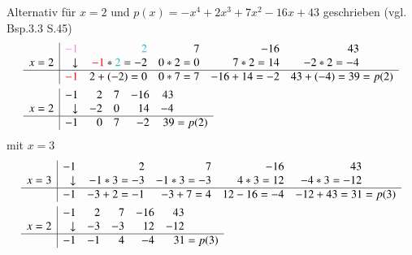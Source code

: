 \documentclass[10pt,a4paper]{article}
\begin{document}
Alternativ für $x=2$ und $p(x) = -x^4 + 2x^3 + 7x^2 - 16x + 43$ geschrieben (vgl. Bsp.3.3 S.45)
\begin{align*}
&\begin{array}[htbp]{c|rrrrr}
	      & {\color{Lavender}-1} & {\color{Turquoise}2}                    & 7      & -16         & 43 \qquad \quad \\
	x = 2 & \downarrow           & {\color{red}-1}*{\color{Turquoise}2}=-2 & 0*2= 0 & 7*2 = 14    & -2*2 = -4 \qquad \quad \\ \hline
	      & {\color{red}-1}      & 2+(-2)=0                                & 0*7=7  & -16+14 = -2 & 43+(-4) = 39 = p(2)
\end{array} \\
&\begin{array}[htbp]{c|rrrrr}
	      & -1         & 2  & 7 & -16 & 43  \qquad \quad      \\
	x = 2 & \downarrow & -2 & 0 & 14  & -4 \qquad \quad      \\ \hline
	      & -1         & 0  & 7 & -2  & 39 = p(2)
\end{array}
\end{align*}
mit $x=3$
\begin{align*}
&\begin{array}[htbp]{c|rrrrr}
	      & -1         & 2       & 7       & -16        & 43         \qquad \quad \\
	x = 3 & \downarrow & -1*3=-3 & -1*3=-3 & 4*3 = 12   & -4*3 = -12 \qquad \quad \\ \hline
	      & -1         & -3+2=-1 & -3+7=4  & 12-16 = -4 & -12+43 = 31 = p(3)
\end{array} \\
&\begin{array}[htbp]{c|rrrrr}
	      & -1         & 2  & 7  & -16 & 43   \qquad \quad \\
	x = 2 & \downarrow & -3 & -3 & 12  & -12  \qquad \quad \\ \hline
	      & -1         & -1 & 4  & -4  & 31 = p(3)
\end{array}
\end{align*}
\end{document}
